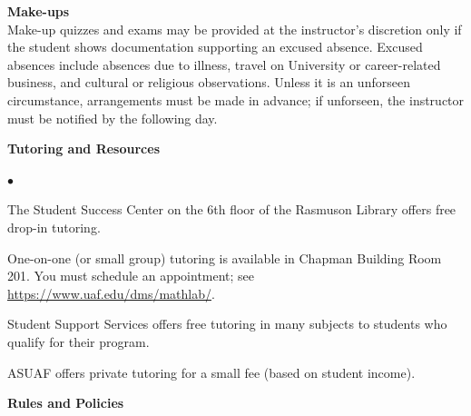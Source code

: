 \documentclass[12pt]{article}
\renewcommand{\emph}[1]{\textsf{\textbf{#1}}}
\newcommand{\localhead}[1]{\par\smallskip\textbf{#1}\nobreak\\}%
\def\heading#1{\localhead{\large\emph{#1}}}
\def\subheading#1{\localhead{\emph{#1}}}
\newenvironment{clist}%
{\bgroup\parskip 0pt\begin{list}{$\bullet$}{\partopsep 4pt\topsep 0pt\itemsep -2pt}}%
{\end{list}\egroup}%
\begin{document}
\heading{Make-ups}
Make-up quizzes and exams may be provided at the instructor's discretion only if
the student shows documentation supporting an excused absence. Excused
absences include absences due to illness, travel on University or
career-related business, and cultural or religious
observations. Unless it is an unforseen circumstance, arrangements
must be made in advance; if unforseen, the instructor must be notified
by the following day.

\heading{Tutoring and Resources}
\vskip -30pt\strut
\begin{clist}
	\item The Student Success Center on the 6th floor of the Rasmuson Library offers free drop-in tutoring.
	\item One-on-one (or small group) tutoring is available in 
Chapman Building Room 201. You must schedule an
appointment; see \url{https://www.uaf.edu/dms/mathlab/}.
	\item Student Support Services offers free tutoring in many subjects to students who qualify for their program.
	\item ASUAF offers private tutoring for a small fee (based on student income).
\end{clist}

\heading{Rules and Policies}
\vskip -20pt


\end{document}
